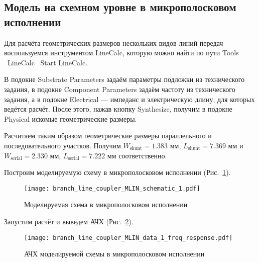 \subsection{Модель на схемном уровне в микрополосковом исполнении}

Для расчёта геометрических размеров нескольких видов линий передач воспользуемся инструментом LineCalc, которую можно найти по пути Tools \textrightarrow\ LineCalc \textrightarrow\ Start LineCalc.

В подокне Substrate Parameters задаём параметры подложки из технического задания, в подокне Component Parameters задаём частоту из технического задания, а в подокне Electrical --- импеданс и электрическую длину, для которых ведётся расчёт.
После этого, нажав кнопку Synthesize, получим в подокне Physical искомые геометрические размеры.

Расчитаем таким образом геометрические размеры параллельного и последовательного участков.
Получим $W_\text{shunt} = 1.383 \text{~мм}$, $L_\text{shunt} = 7.369 \text{~мм}$ и $W_\text{serial} = 2.330 \text{~мм}$, $L_\text{serial} = 7.222 \text{~мм}$ соответственно.

Построим моделируемую схему в микрополосковом исполнении (Рис.~\ref{fig:branch_line_coupler_MLIN_schematic_1}).

\begin{figure}[!ht]
    \centering
    \texttt{[image: branch\_line\_coupler\_MLIN\_schematic\_1.pdf]}
    \caption{Моделируемая схема в микрополосковом исполнении}%
    \label{fig:branch_line_coupler_MLIN_schematic_1}
\end{figure}

Запустим расчёт и выведем АЧХ (Рис.~\ref{fig:branch_line_coupler_MLIN_data_1_freq_response}).

\begin{figure}[!ht]
    \centering
    \texttt{[image: branch\_line\_coupler\_MLIN\_data\_1\_freq\_response.pdf]}
    \caption{АЧХ моделируемой схемы в микрополосковом исполнении}%
    \label{fig:branch_line_coupler_MLIN_data_1_freq_response}
\end{figure}


